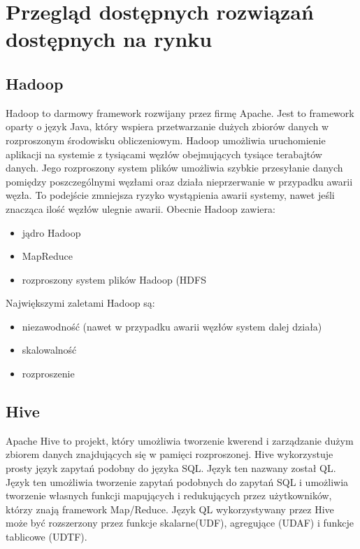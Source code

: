 \section{Przegląd dostępnych rozwiązań dostępnych na rynku}
\label{sec:solutions}



\subsection{Hadoop}
\label{sec:solutions:hadoop}
Hadoop to darmowy framework rozwijany przez firmę Apache. Jest to framework oparty o język Java, który wspiera przetwarzanie  dużych zbiorów danych w rozproszonym środowisku obliczeniowym. Hadoop umożliwia uruchomienie aplikacji na systemie z tysiącami węzłów obejmujących tysiące terabajtów danych. Jego rozproszony system plików umożliwia szybkie przesyłanie danych pomiędzy poszczególnymi węzłami oraz działa nieprzerwanie w przypadku awarii węzła. To podejście zmniejsza  ryzyko wystąpienia awarii systemy, nawet jeśli znacząca ilość węzłów ulegnie awarii. Obecnie Hadoop zawiera:
\begin{itemize}[noitemsep]
\item jądro Hadoop
\item MapReduce
\item rozproszony system plików Hadoop (HDFS
\end{itemize}

Największymi zaletami Hadoop są:
\begin{itemize}[noitemsep]
\item niezawodność (nawet w przypadku awarii węzłów system dalej działa)
\item skalowalność
\item rozproszenie
\end{itemize}



\subsection{Hive}
\label{sec:solutions:hive}
Apache Hive to projekt, który umożliwia tworzenie kwerend i zarządzanie dużym zbiorem danych znajdujących się w pamięci rozproszonej. Hive wykorzystuje prosty język zapytań podobny do języka SQL. Język ten nazwany został QL. Język ten umożliwia tworzenie zapytań podobnych do zapytań SQL i umożliwia tworzenie własnych funkcji mapujących i redukujących przez użytkowników, którzy znają framework Map/Reduce. Język QL wykorzystywany przez Hive może być rozszerzony przez funkcje skalarne(UDF), agregujące (UDAF) i funkcje tablicowe (UDTF).

